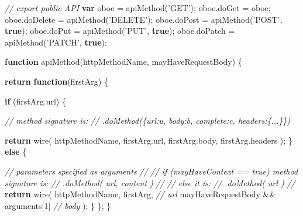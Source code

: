 \documentclass[]{article}
\newenvironment{Shaded}{}{}
\newcommand{\KeywordTok}[1]{\textcolor[rgb]{0.00,0.44,0.13}{\textbf{{#1}}}}
\newcommand{\DecValTok}[1]{\textcolor[rgb]{0.25,0.63,0.44}{{#1}}}
\newcommand{\StringTok}[1]{\textcolor[rgb]{0.25,0.44,0.63}{{#1}}}
\newcommand{\CommentTok}[1]{\textcolor[rgb]{0.38,0.63,0.69}{\textit{{#1}}}}
\newcommand{\OtherTok}[1]{\textcolor[rgb]{0.00,0.44,0.13}{{#1}}}
\newcommand{\FunctionTok}[1]{\textcolor[rgb]{0.02,0.16,0.49}{{#1}}}
\newcommand{\NormalTok}[1]{{#1}}
\begin{document}
\begin{Shaded}
\begin{Highlighting}[]
\CommentTok{// export public API}
\KeywordTok{var} \NormalTok{oboe = }\FunctionTok{apiMethod}\NormalTok{(}\StringTok{'GET'}\NormalTok{);}
\OtherTok{oboe}\NormalTok{.}\FunctionTok{doGet}    \NormalTok{= oboe;}
\OtherTok{oboe}\NormalTok{.}\FunctionTok{doDelete} \NormalTok{= }\FunctionTok{apiMethod}\NormalTok{(}\StringTok{'DELETE'}\NormalTok{);}
\OtherTok{oboe}\NormalTok{.}\FunctionTok{doPost}   \NormalTok{= }\FunctionTok{apiMethod}\NormalTok{(}\StringTok{'POST'}\NormalTok{, }\KeywordTok{true}\NormalTok{);}
\OtherTok{oboe}\NormalTok{.}\FunctionTok{doPut}    \NormalTok{= }\FunctionTok{apiMethod}\NormalTok{(}\StringTok{'PUT'}\NormalTok{, }\KeywordTok{true}\NormalTok{);}
\OtherTok{oboe}\NormalTok{.}\FunctionTok{doPatch}  \NormalTok{= }\FunctionTok{apiMethod}\NormalTok{(}\StringTok{'PATCH'}\NormalTok{, }\KeywordTok{true}\NormalTok{);}

\KeywordTok{function} \FunctionTok{apiMethod}\NormalTok{(httpMethodName, mayHaveRequestBody) \{}
               
   \KeywordTok{return} \KeywordTok{function}\NormalTok{(firstArg) \{}

      \KeywordTok{if} \NormalTok{(}\OtherTok{firstArg}\NormalTok{.}\FunctionTok{url}\NormalTok{) \{}

         \CommentTok{// method signature is:}
         \CommentTok{//    .doMethod(\{url:u, body:b, complete:c, headers:\{...\}\})}

         \KeywordTok{return} \FunctionTok{wire}\NormalTok{(}
             \NormalTok{httpMethodName,}
             \OtherTok{firstArg}\NormalTok{.}\FunctionTok{url}\NormalTok{,}
             \OtherTok{firstArg}\NormalTok{.}\FunctionTok{body}\NormalTok{,}
             \OtherTok{firstArg}\NormalTok{.}\FunctionTok{headers}
         \NormalTok{);}
      \NormalTok{\} }\KeywordTok{else} \NormalTok{\{}

         \CommentTok{// parameters specified as arguments}
         \CommentTok{//}
         \CommentTok{//  if (mayHaveContext == true) method signature is:}
         \CommentTok{//     .doMethod( url, content )}
         \CommentTok{//}
         \CommentTok{//  else it is:}
         \CommentTok{//     .doMethod( url )            }
         \CommentTok{//                                }
         \KeywordTok{return} \FunctionTok{wire}\NormalTok{(}
             \NormalTok{httpMethodName,}
             \NormalTok{firstArg, }\CommentTok{// url}
             \NormalTok{mayHaveRequestBody && arguments[}\DecValTok{1}\NormalTok{]         }\CommentTok{// body}
         \NormalTok{);}
      \NormalTok{\}}
   \NormalTok{\};}
\NormalTok{\}   }
\end{Highlighting}
\end{Shaded}
\end{document}
